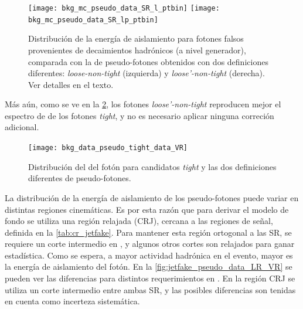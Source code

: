 \begin{figure}[!h]
  \centering

  \texttt{[image: bkg\_mc\_pseudo\_data\_SR\_l\_ptbin]}
  \texttt{[image: bkg\_mc\_pseudo\_data\_SR\_lp\_ptbin]}

  \caption{Distribución de la energía de aislamiento para fotones falsos
    provenientes de decaimientos hadrónicos (a nivel generador), comparada con
    la de pseudo-fotones obtenidos con dos definiciones diferentes: \emph{loose-non-tight} (izquierda)
    y \emph{loose'-non-tight} (derecha). Ver detalles en el texto.}
  \label{fig:jetfake_mc_data}

\end{figure}

Más aún, como se ve en la \cref{fig:jetfake_pseudo_data_pt}, los fotones \emph{loose'-non-tight}
reproducen mejor el espectro de {\pt} de los fotones \emph{tight}, y no es necesario
aplicar ninguna correción adicional.

\begin{figure}[!h]
  \centering

  \texttt{[image: bkg\_data\_pseudo\_tight\_data\_VR]}

  \caption{Distribución del {\pt} del fotón para candidatos
    \emph{tight} y las dos definiciones diferentes de pseudo-fotones.}
  \label{fig:jetfake_pseudo_data_pt}

\end{figure}


La distribución de la energía de aislamiento de los pseudo-fotones puede variar
en distintas regiones cinemáticas. Es por esta razón que para derivar el modelo
de fondo se utiliza una región relajada (CRJ), cercana a las regiones de señal, definida en
la \cref{tab:cr_jetfake}. Para mantener esta región ortogonal a las SR, se
requiere un corte intermedio en {\met}, y algunos otros cortes son relajados
para ganar estadística. Como se espera, a mayor actividad hadrónica en el
evento, mayor es la energía de aislamiento del fotón. En la
\cref{fig:jetfake_pseudo_data_LR_VR} se pueden ver las diferencias para distintos
requerimientos en {\HT}. En la región CRJ se utiliza un corte intermedio entre
ambas SR, y las posibles diferencias son tenidas en cuenta como incerteza
sistemática.



